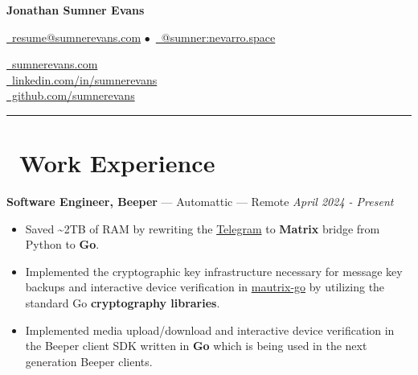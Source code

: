 \documentclass[10pt,letterpaper]{article}
\begin{document}
\begin{minipage}[b][][b]{0.5\linewidth}
    {\huge\textbf{Jonathan Sumner Evans}}

    \vspace{5pt}
    \href{mailto:resume@sumnerevans.com}{\faEnvelope\ resume@sumnerevans.com}
    $\bullet$\ \href{https://matrix.to/#/@sumner:nevarro.space}{\faMatrixOrg\ @sumner:nevarro.space}
\end{minipage}\hfill
\begin{minipage}[b][][b]{0.278\linewidth}
    \href{https://sumnerevans.com}{\faGlobe\ sumnerevans.com} \\
    \href{https://www.linkedin.com/in/sumnerevans}{\faLinkedin\ linkedin.com/in/sumnerevans} \\
    \href{https://github.com/sumnerevans}{\faGithub\ github.com/sumnerevans}
\end{minipage}
\rule{\textwidth}{0.5pt}

\section*{\faBriefcase\ Work Experience}
{\fontsize{11}{0}
\textbf{Software Engineer, Beeper} --- Automattic --- Remote}
\hfill \textit{April 2024 - Present}
\begin{itemize}
    \item Saved {\textasciitilde}2TB of RAM by rewriting the
        \href{https://github.com/mautrix/telegramgo}{Telegram}
        to \textbf{Matrix} bridge from Python to \textbf{Go}.
    \item Implemented the cryptographic key infrastructure necessary for message
        key backups and interactive device verification in
        \href{https://github.com/mautrix/go}{mautrix-go} by utilizing the
        standard Go \textbf{cryptography libraries}.
    \item Implemented media upload/download and interactive device verification
        in the Beeper client SDK written in \textbf{Go} which is being used in
        the next generation Beeper clients.
\end{itemize}
\end{document}
